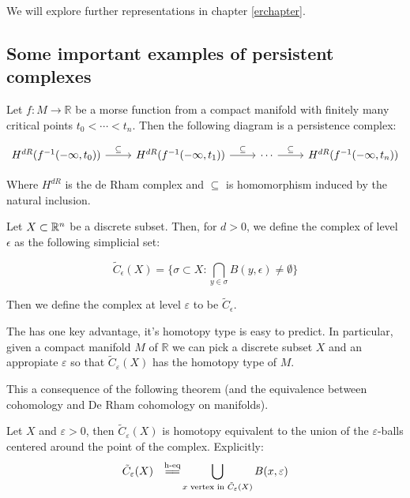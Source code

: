 We will explore further representations in chapter \ref{erchapter}.


\subsection{Some important examples of persistent complexes}
\label{examplespersistence}

\begin{definition}
Let $f:M\to\mathbb{R}$ be a morse function from a compact manifold 
with finitely many critical points $t_0<\cdots<t_n$. Then the following diagram
is a persistence complex:

$$
\begin{tikzcd}
H^{dR}(f^{-1}(-\infty,t_0)) \arrow[r,"\subseteq"]
& H^{dR}(f^{-1}(-\infty,t_1)) \arrow[r,"\subseteq"]
& \cdots\arrow[r,"\subseteq"]
& H^{dR}(f^{-1}(-\infty,t_n))
\end{tikzcd}
$$

Where $H^{dR}$ is the de Rham complex and $\subseteq$
is homomorphism induced by the natural inclusion.

\end{definition}

\begin{definition}

Let $X\subset \mathbb{R}^n$ be a discrete subset. Then, for $d>0$, we define the {\Cech}
complex of level $\epsilon$ as the following simplicial set:


$$
\tilde{C}_\epsilon(X)
=
\{
\sigma \subset X :
\bigcap_{y\in\sigma} B(y,\epsilon)\neq \emptyset
\}
$$

Then we define the {\Cech} complex at level $\varepsilon$ to be $\tilde{C}_\epsilon$.

\end{definition}


The {\Cech} has one key advantage,
it's homotopy type is easy to predict.
In particular, given a compact manifold $M$ of $\mathbb{R}$
we can pick a discrete subset $X$ and an appropiate $\varepsilon$
so that $\tilde C_\varepsilon(X)$ has the homotopy type of $M$.

This a consequence of the following theorem (and 
the equivalence between {\Cech} cohomology and De Rham
cohomology on manifolds).

\begin{theorem}
Let $X$ and $\varepsilon>0$, then $\tilde C_\varepsilon(X)$
is homotopy equivalent to the union of the $\varepsilon$-balls centered 
around the point of the complex. Explicitly:
$$
\tilde C_\varepsilon(X)
\quad
\overset{\text{h-eq}}
{{
=
\joinrel=
}}
\displaystyle\bigcup_{x \text{
vertex in 
}
\tilde C_\varepsilon(X)
}
B(x,\varepsilon)
$$
\end{theorem}


